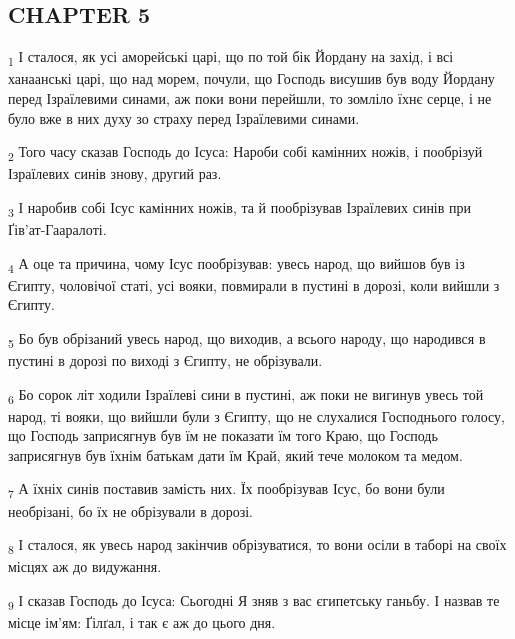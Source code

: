 \subsection{CHAPTER 5}
\begin{tcolorbox}
\textsubscript{1} І сталося, як усі аморейські царі, що по той бік Йордану на захід, і всі ханаанські царі, що над морем, почули, що Господь висушив був воду Йордану перед Ізраїлевими синами, аж поки вони перейшли, то зомліло їхнє серце, і не було вже в них духу зо страху перед Ізраїлевими синами.
\end{tcolorbox}
\begin{tcolorbox}
\textsubscript{2} Того часу сказав Господь до Ісуса: Нароби собі камінних ножів, і пообрізуй Ізраїлевих синів знову, другий раз.
\end{tcolorbox}
\begin{tcolorbox}
\textsubscript{3} І наробив собі Ісус камінних ножів, та й пообрізував Ізраїлевих синів при Ґів'ат-Гааралоті.
\end{tcolorbox}
\begin{tcolorbox}
\textsubscript{4} А оце та причина, чому Ісус пообрізував: увесь народ, що вийшов був із Єгипту, чоловічої статі, усі вояки, повмирали в пустині в дорозі, коли вийшли з Єгипту.
\end{tcolorbox}
\begin{tcolorbox}
\textsubscript{5} Бо був обрізаний увесь народ, що виходив, а всього народу, що народився в пустині в дорозі по виході з Єгипту, не обрізували.
\end{tcolorbox}
\begin{tcolorbox}
\textsubscript{6} Бо сорок літ ходили Ізраїлеві сини в пустині, аж поки не вигинув увесь той народ, ті вояки, що вийшли були з Єгипту, що не слухалися Господнього голосу, що Господь заприсягнув був їм не показати їм того Краю, що Господь заприсягнув був їхнім батькам дати їм Край, який тече молоком та медом.
\end{tcolorbox}
\begin{tcolorbox}
\textsubscript{7} А їхніх синів поставив замість них. Їх пообрізував Ісус, бо вони були необрізані, бо їх не обрізували в дорозі.
\end{tcolorbox}
\begin{tcolorbox}
\textsubscript{8} І сталося, як увесь народ закінчив обрізуватися, то вони осіли в таборі на своїх місцях аж до видужання.
\end{tcolorbox}
\begin{tcolorbox}
\textsubscript{9} І сказав Господь до Ісуса: Сьогодні Я зняв з вас єгипетську ганьбу. І назвав те місце ім'ям: Ґілґал, і так є аж до цього дня.
\end{tcolorbox}
